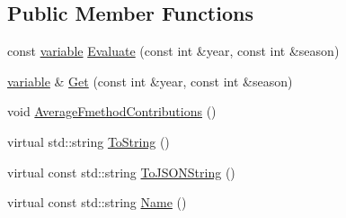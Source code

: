 \subsection*{Public Member Functions}
\begin{DoxyCompactItemize}
\item 
const \hyperlink{structmas_1_1_fishing_mortality_ad7a9ae18fb1cbfe1bf7c2fa0b3e1ee73}{variable} \hyperlink{structmas_1_1_fishing_mortality_a9823a3d091ba0f9f5abf6f234d5bbe95}{Evaluate} (const int \&year, const int \&season)
\item 
\hyperlink{structmas_1_1_fishing_mortality_ad7a9ae18fb1cbfe1bf7c2fa0b3e1ee73}{variable} \& \hyperlink{structmas_1_1_fishing_mortality_a9ee4c943ac5a039e4e99a0f95ecd1b8f}{Get} (const int \&year, const int \&season)
\item 
void \hyperlink{structmas_1_1_fishing_mortality_a9571f43b68311da0487864c37943bc99}{Average\-Fmethod\-Contributions} ()
\item 
virtual std\-::string \hyperlink{structmas_1_1_fishing_mortality_a584a63c9d45ec427965f2d98c2a88c81}{To\-String} ()
\item 
virtual const std\-::string \hyperlink{structmas_1_1_fishing_mortality_ac76d1e34d6c062d090bc5265d100395d}{To\-J\-S\-O\-N\-String} ()
\item 
virtual const std\-::string \hyperlink{structmas_1_1_fishing_mortality_a32f715666745e58a7f24e5537b2ccf19}{Name} ()
\end{DoxyCompactItemize}
